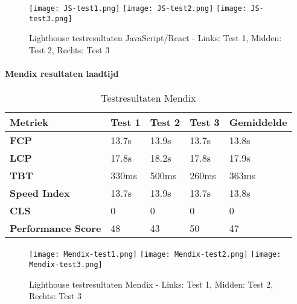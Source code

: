 \begin{figure}[htbp]
    \centering
    \captionsetup{justification=centering}
    \texttt{[image: JS-test1.png]}
    \hfill
    \texttt{[image: JS-test2.png]}
    \hfill
    \texttt{[image: JS-test3.png]}
    \caption{Lighthouse testresultaten JavaScript/React - Links: Test 1, Midden: Test 2, Rechts: Test 3}
    \label{fig:javascript-simple}
\end{figure}

\newpage
\paragraph{Mendix resultaten laadtijd}

\begin{table}[h]
    \centering
    \begin{tabular}{ |p{3cm}|p{2.75cm}|p{2.75cm}|p{2.75cm}|p{2.75cm}|}
        \hline
        \textbf{Metriek} & \textbf{Test 1} & \textbf{Test 2}  & \textbf{Test 3} & \textbf{Gemiddelde}\\
        \hline
        \textbf{\gls{FCP}}  & 13.7s & 13.9s & 13.7s & 13.8s \\
        \hline
        \textbf{\gls{LCP}} & 17.8s & 18.2s & 17.8s & 17.9s\\
        \hline
        \textbf{\gls{TBT}}  & 330ms & 500ms & 260ms & 363ms \\
        \hline
        \textbf{Speed Index}  & 13.7s & 13.9s & 13.7s & 13.8s \\
        \hline
        \textbf{\gls{CLS}}  & 0 & 0  & 0 & 0 \\
        \hline
        \textbf{Performance Score}  & 48 & 43  & 50 & 47 \\
        \hline
    \end{tabular}
    \caption[\centering Testresultaten laadtijd Mendix]{\label{tab:Testresultaten Mendix}Testresultaten Mendix}
\end{table}

\begin{figure}[htbp]
    \centering
    \captionsetup{justification=centering}
    \texttt{[image: Mendix-test1.png]}
    \hfill
    \texttt{[image: Mendix-test2.png]}
    \hfill
    \texttt{[image: Mendix-test3.png]}
    \caption{Lighthouse testresultaten Mendix - Links: Test 1, Midden: Test 2, Rechts: Test 3}
    \label{fig:mendix-simple}
\end{figure}
\newpage
